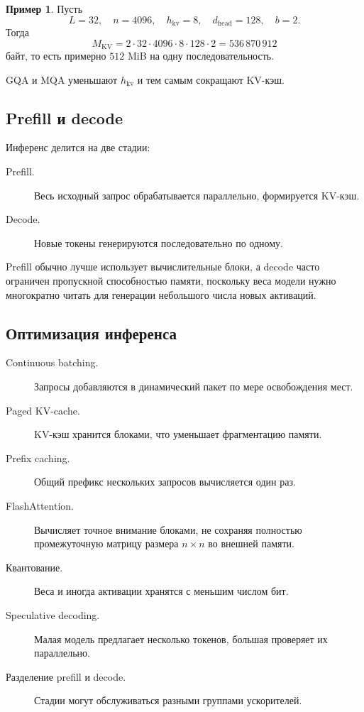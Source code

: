 \documentclass[12pt,a4paper]{article}
\newcommand{\1}{\mathbf{1}}
\theoremstyle{definition}
\newtheorem{example}[theorem]{Пример}
\theoremstyle{remark}
\begin{document}
\begin{example}
Пусть
\[
L=32,\quad n=4096,\quad
h_{\mathrm{kv}}=8,\quad
d_{\mathrm{head}}=128,\quad b=2.
\]
Тогда
\[
M_{\mathrm{KV}}
=
2\cdot32\cdot4096\cdot8\cdot128\cdot2
=
536\,870\,912
\]
байт, то есть примерно $512$ MiB на одну последовательность.
\end{example}

GQA и MQA уменьшают $h_{\mathrm{kv}}$ и тем самым сокращают KV-кэш.

\subsection{Prefill и decode}

Инференс делится на две стадии:

\begin{description}
    \item[Prefill.] Весь исходный запрос обрабатывается параллельно,
    формируется KV-кэш.

    \item[Decode.] Новые токены генерируются последовательно по одному.
\end{description}

Prefill обычно лучше использует вычислительные блоки, а decode часто
ограничен пропускной способностью памяти, поскольку веса модели нужно
многократно читать для генерации небольшого числа новых активаций.

\subsection{Оптимизация инференса}

\begin{description}
    \item[Continuous batching.] Запросы добавляются в динамический пакет
    по мере освобождения мест.

    \item[Paged KV-cache.] KV-кэш хранится блоками, что уменьшает
    фрагментацию памяти.

    \item[Prefix caching.] Общий префикс нескольких запросов вычисляется
    один раз.

    \item[FlashAttention.] Вычисляет точное внимание блоками, не сохраняя
    полностью промежуточную матрицу размера $n\times n$ во внешней памяти.

    \item[Квантование.] Веса и иногда активации хранятся с меньшим числом
    бит.

    \item[Speculative decoding.] Малая модель предлагает несколько
    токенов, большая проверяет их параллельно.

    \item[Разделение prefill и decode.] Стадии могут обслуживаться
    разными группами ускорителей.
\end{description}
\end{document}
